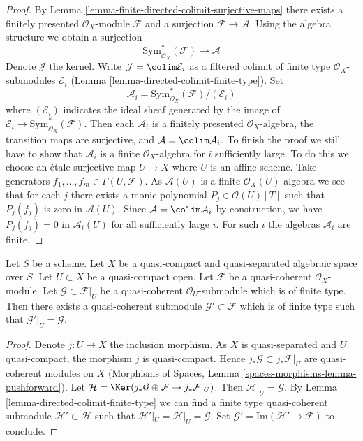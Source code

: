\begin{proof}
By Lemma \ref{lemma-finite-directed-colimit-surjective-maps}
there exists a finitely presented $\mathcal{O}_X$-module
$\mathcal{F}$ and a surjection $\mathcal{F} \to \mathcal{A}$.
Using the algebra structure we obtain a surjection
$$
\text{Sym}^*_{\mathcal{O}_X}(\mathcal{F}) \longrightarrow \mathcal{A}
$$
Denote $\mathcal{J}$ the kernel. Write $\mathcal{J} = \colim \mathcal{E}_i$
as a filtered colimit of finite type $\mathcal{O}_X$-submodules
$\mathcal{E}_i$ (Lemma \ref{lemma-directed-colimit-finite-type}). Set
$$
\mathcal{A}_i = \text{Sym}^*_{\mathcal{O}_X}(\mathcal{F})/(\mathcal{E}_i)
$$
where $(\mathcal{E}_i)$ indicates the ideal sheaf generated by
the image of $\mathcal{E}_i \to \text{Sym}^*_{\mathcal{O}_X}(\mathcal{F})$.
Then each $\mathcal{A}_i$ is a finitely presented $\mathcal{O}_X$-algebra,
the transition maps are surjective, and $\mathcal{A} = \colim \mathcal{A}_i$.
To finish the proof we still
have to show that $\mathcal{A}_i$ is a finite $\mathcal{O}_X$-algebra
for $i$ sufficiently large. To do this we choose an \'etale surjective
map $U \to X$ where $U$ is an affine scheme. Take generators
$f_1, \ldots, f_m \in \Gamma(U, \mathcal{F})$.
As $\mathcal{A}(U)$ is a finite $\mathcal{O}_X(U)$-algebra we
see that for each $j$ there exists a monic polynomial
$P_j \in \mathcal{O}(U)[T]$ such that $P_j(f_j)$ is zero in $\mathcal{A}(U)$.
Since $\mathcal{A} = \colim \mathcal{A}_i$ by construction, we
have $P_j(f_j) = 0$ in $\mathcal{A}_i(U)$ for all sufficiently large $i$.
For such $i$ the algebras $\mathcal{A}_i$ are finite.
\end{proof}

\begin{lemma}
\label{lemma-extend}
Let $S$ be a scheme.
Let $X$ be a quasi-compact and quasi-separated algebraic space over $S$.
Let $U \subset X$ be a quasi-compact open.
Let $\mathcal{F}$ be a quasi-coherent $\mathcal{O}_X$-module.
Let $\mathcal{G} \subset \mathcal{F}|_U$ be a quasi-coherent
$\mathcal{O}_U$-submodule which is of finite type. Then
there exists a quasi-coherent submodule $\mathcal{G}' \subset \mathcal{F}$
which is of finite type such that $\mathcal{G}'|_U = \mathcal{G}$.
\end{lemma}

\begin{proof}
Denote $j : U \to X$ the inclusion morphism. As $X$ is quasi-separated
and $U$ quasi-compact, the morphism $j$ is quasi-compact. Hence
$j_*\mathcal{G} \subset j_*\mathcal{F}|_U$ are quasi-coherent modules
on $X$ (Morphisms of Spaces, Lemma
\ref{spaces-morphisms-lemma-pushforward}).
Let $\mathcal{H} =
\Ker(j_*\mathcal{G} \oplus \mathcal{F} \to j_*\mathcal{F}|_U)$.
Then $\mathcal{H}|_U = \mathcal{G}$. By
Lemma \ref{lemma-directed-colimit-finite-type}
we can find a finite type quasi-coherent submodule
$\mathcal{H}' \subset \mathcal{H}$ such that
$\mathcal{H}'|_U = \mathcal{H}|_U = \mathcal{G}$.
Set $\mathcal{G}' = \text{Im}(\mathcal{H}' \to \mathcal{F})$
to conclude.
\end{proof}










